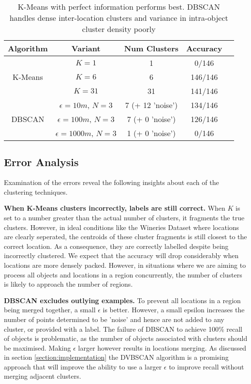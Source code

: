 \begin{table}[h!]
	\begin{center}
		\begin{tabular}{ |c|c|c|c|c| } 
			\hline
			Algorithm & Variant & Num Clusters & Accuracy \\
			\hline
			\multirow{3}{4em}{K-Means} & $K=1$ & 1 & 0/146 \\ 
			& $K=6$ & 6 & 146/146 \\ 
			& $K=31$ & 31 & 141/146 \\ 
			\hline
			\multirow{3}{4em}{DBSCAN} & $\epsilon=10m$, $N=3$ & 7 (+ 12 'noise') & 134/146 \\ 
			& $\epsilon=100m$, $N=3$ & 7 (+ 0 'noise') & 126/146 \\ 
			& $\epsilon=1000m$, $N=3$ & 1 (+ 0 'noise') & 0/146 \\ 
			\hline
		\end{tabular}
		\label{table:clustering}
		\caption{K-Means with perfect information performs best. DBSCAN handles dense inter-location clusters and variance in intra-object cluster density poorly}
	\end{center}
\end{table}

\subsection{Error Analysis}
Examination of the errors reveal the following insights about each of the clustering techniques. 

\textbf{When K-Means clusters incorrectly, labels are still correct.} When $K$ is set to a number greater than the actual number of clusters, it fragments the true clusters. 
However, in ideal conditions like the Wineries Dataset where locations are clearly seperated, the centroids of these cluster fragments is still closest to the correct location. 
As a consequence, they are correctly labelled despite being incorrectly clustered. We expect that the accuracy will drop considerably when locations are more densely packed. However, in situations where we are aiming to process all objects and locations in a region concurrently, the number of clusters is likely to approach the number of regions. 

\textbf{DBSCAN excludes outlying examples.} To prevent all locations in a region being merged together, a small $\epsilon$ is better. However, a small epsilon increases the number of points determined to be 'noise' and hence are not added to any cluster, or provided with a label. 
The failure of DBSCAN to achieve 100\% recall of objects is problematic, as the number of objects associated with clusters should be maximised. Making $\epsilon$ larger however results in locations merging. As discussed in section \ref{section:implementation} the DVBSCAN algorithm is a promising approach that will improve the ability to use a larger $\epsilon$ to improve recall without merging adjacent clusters. 

